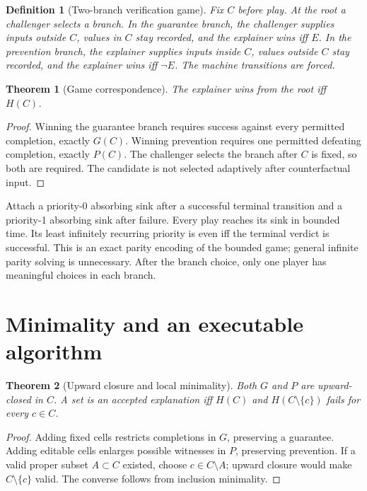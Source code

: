 \documentclass[11pt]{article}
\newtheorem{definition}{Definition}
\newtheorem{theorem}{Theorem}
\begin{document}
\begin{definition}[Two-branch verification game]
Fix $C$ before play. At the root a challenger selects a branch.
In the guarantee branch, the challenger supplies inputs outside $C$,
values in $C$ stay recorded, and the explainer wins iff $E$.
In the prevention branch, the explainer supplies inputs inside $C$,
values outside $C$ stay recorded, and the explainer wins iff $\neg E$.
The machine transitions are forced.
\end{definition}
\begin{theorem}[Game correspondence]
The explainer wins from the root iff $H(C)$.
\end{theorem}
\begin{proof}
Winning the guarantee branch requires success against every permitted completion,
exactly $G(C)$. Winning prevention requires one permitted defeating completion,
exactly $P(C)$. The challenger selects the branch after $C$ is fixed, so both
are required. The candidate is not selected adaptively after counterfactual input.
\end{proof}

Attach a priority-0 absorbing sink after a successful terminal transition and a
priority-1 absorbing sink after failure. Every play reaches its sink in bounded
time. Its least infinitely recurring priority is even iff the terminal verdict
is successful. This is an exact parity encoding of the bounded game; general
infinite parity solving is unnecessary. After the branch choice, only one
player has meaningful choices in each branch.

\section{Minimality and an executable algorithm}
\begin{theorem}[Upward closure and local minimality]\label{thm:min}
Both $G$ and $P$ are upward-closed in $C$. A set is an accepted explanation iff
$H(C)$ and $H(C\setminus\{c\})$ fails for every $c\in C$.
\end{theorem}
\begin{proof}
Adding fixed cells restricts completions in $G$, preserving a guarantee.
Adding editable cells enlarges possible witnesses in $P$, preserving prevention.
If a valid proper subset $A\subset C$ existed, choose $c\in C\setminus A$;
upward closure would make $C\setminus\{c\}$ valid. The converse follows from
inclusion minimality.
\end{proof}
\end{document}
